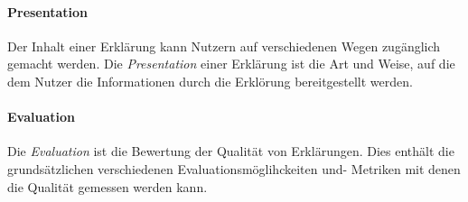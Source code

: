 \paragraph{Presentation} Der Inhalt einer Erklärung kann Nutzern auf verschiedenen Wegen zugänglich gemacht werden. Die \textit{Presentation} einer Erklärung ist die Art und Weise, auf die dem Nutzer die Informationen durch die Erklörung bereitgestellt werden.

\paragraph{Evaluation} Die \textit{Evaluation} ist die Bewertung der Qualität von Erklärungen. Dies enthält die grundsätzlichen verschiedenen Evaluationsmöglihckeiten und- Metriken mit denen die Qualität gemessen werden kann.







